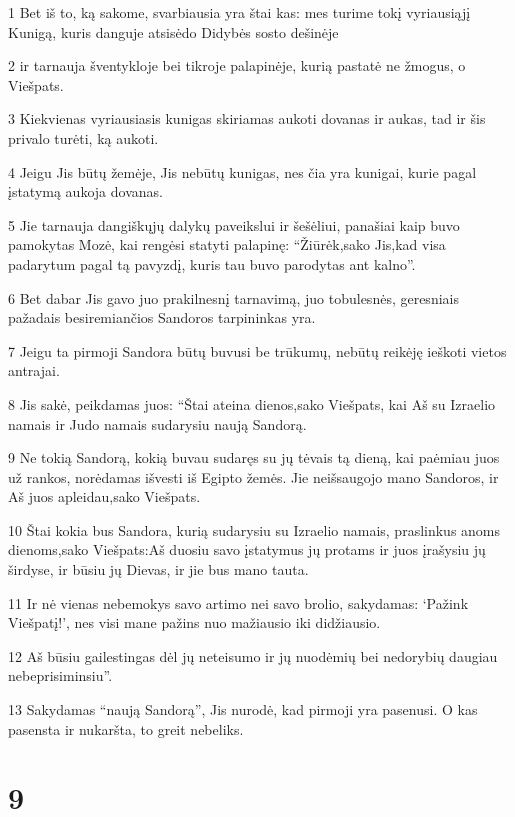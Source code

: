 \par 1 Bet iš to, ką sakome, svarbiausia yra štai kas: mes turime tokį vyriausiąjį Kunigą, kuris danguje atsisėdo Didybės sosto dešinėje 
\par 2 ir tarnauja šventykloje bei tikroje palapinėje, kurią pastatė ne žmogus, o Viešpats. 
\par 3 Kiekvienas vyriausiasis kunigas skiriamas aukoti dovanas ir aukas, tad ir šis privalo turėti, ką aukoti. 
\par 4 Jeigu Jis būtų žemėje, Jis nebūtų kunigas, nes čia yra kunigai, kurie pagal įstatymą aukoja dovanas. 
\par 5 Jie tarnauja dangiškųjų dalykų paveikslui ir šešėliui, panašiai kaip buvo pamokytas Mozė, kai rengėsi statyti palapinę: “Žiūrėk,­sako Jis,­kad visa padarytum pagal tą pavyzdį, kuris tau buvo parodytas ant kalno”. 
\par 6 Bet dabar Jis gavo juo prakilnesnį tarnavimą, juo tobulesnės, geresniais pažadais besiremiančios Sandoros tarpininkas yra. 
\par 7 Jeigu ta pirmoji Sandora būtų buvusi be trūkumų, nebūtų reikėję ieškoti vietos antrajai. 
\par 8 Jis sakė, peikdamas juos: “Štai ateina dienos,­sako Viešpats,­ kai Aš su Izraelio namais ir Judo namais sudarysiu naują Sandorą. 
\par 9 Ne tokią Sandorą, kokią buvau sudaręs su jų tėvais tą dieną, kai paėmiau juos už rankos, norėdamas išvesti iš Egipto žemės. Jie neišsaugojo mano Sandoros, ir Aš juos apleidau,­sako Viešpats.­ 
\par 10 Štai kokia bus Sandora, kurią sudarysiu su Izraelio namais, praslinkus anoms dienoms,­sako Viešpats:­Aš duosiu savo įstatymus jų protams ir juos įrašysiu jų širdyse, ir būsiu jų Dievas, ir jie bus mano tauta. 
\par 11 Ir nė vienas nebemokys savo artimo nei savo brolio, sakydamas: ‘Pažink Viešpatį!’, nes visi mane pažins nuo mažiausio iki didžiausio. 
\par 12 Aš būsiu gailestingas dėl jų neteisumo ir jų nuodėmių bei nedorybių daugiau nebeprisiminsiu”. 
\par 13 Sakydamas “naują Sandorą”, Jis nurodė, kad pirmoji yra pasenusi. O kas pasensta ir nukaršta, to greit nebeliks.


\chapter{9}



